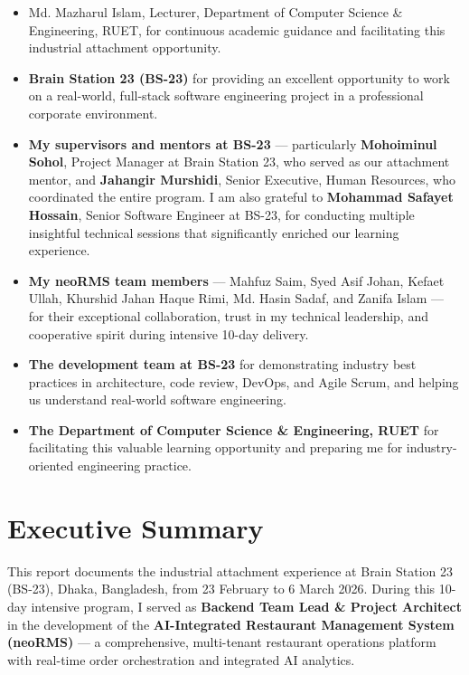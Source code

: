 \documentclass[12pt,a4paper,oneside]{report}
\newcommand{\supervisorname}{Md. Mazharul Islam}
\newcommand{\supervisortitle}{Lecturer}
\newcommand{\department}{Department of Computer Science \& Engineering}
\begin{document}
\begin{itemize}[leftmargin=1.5em]
\item \supervisorname, \supervisortitle, \department, RUET, for continuous academic guidance and facilitating this industrial attachment opportunity.
\item \textbf{Brain Station 23 (BS-23)} for providing an excellent opportunity to work on a real-world, full-stack software engineering project in a professional corporate environment.
\item \textbf{My supervisors and mentors at BS-23} --- particularly \textbf{Mohoiminul Sohol}, Project Manager at Brain Station 23, who served as our attachment mentor, and \textbf{Jahangir Murshidi}, Senior Executive, Human Resources, who coordinated the entire program. I am also grateful to \textbf{Mohammad Safayet Hossain}, Senior Software Engineer at BS-23, for conducting multiple insightful technical sessions that significantly enriched our learning experience.
\item \textbf{My neoRMS team members} --- Mahfuz Saim, Syed Asif Johan, Kefaet Ullah, Khurshid Jahan Haque Rimi, Md. Hasin Sadaf, and Zanifa Islam --- for their exceptional collaboration, trust in my technical leadership, and cooperative spirit during intensive 10-day delivery.
\item \textbf{The development team at BS-23} for demonstrating industry best practices in architecture, code review, DevOps, and Agile Scrum, and helping us understand real-world software engineering.
\item \textbf{The Department of Computer Science \& Engineering, RUET} for facilitating this valuable learning opportunity and preparing me for industry-oriented engineering practice.
\end{itemize}

\clearpage

\chapter*{Executive Summary}
This report documents the industrial attachment experience at Brain Station 23 (BS-23), Dhaka, Bangladesh, from 23 February to 6 March 2026. During this 10-day intensive program, I served as \textbf{Backend Team Lead \& Project Architect} in the development of the \textbf{AI-Integrated Restaurant Management System (neoRMS)} --- a comprehensive, multi-tenant restaurant operations platform with real-time order orchestration and integrated AI analytics.
\end{document}
